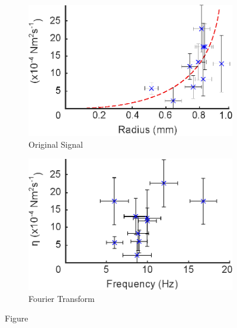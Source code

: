 \documentclass{physics_article_B}
\begin{document}
        \begin{figure}[H]
            \centering   
            \begin{subfigure}[b]{0.48\textwidth}
                \hspace*{0cm}\includegraphics[width=\textwidth]{Figures/r_vs_eta.eps}
                \caption{Original Signal}
                \label{fig:vseta:r}
            \end{subfigure}\hspace{3pt}
            \begin{subfigure}[b]{0.48\textwidth}
                \hspace*{0.1cm}\includegraphics[width=\textwidth]{Figures/f_vs_eta.eps} 
                \caption{Fourier Transform}
                \label{fig:vseta:f}
                \end{subfigure}
            \caption{Figure }\label{fig:vseta}
        \end{figure} 
        
\end{document}
